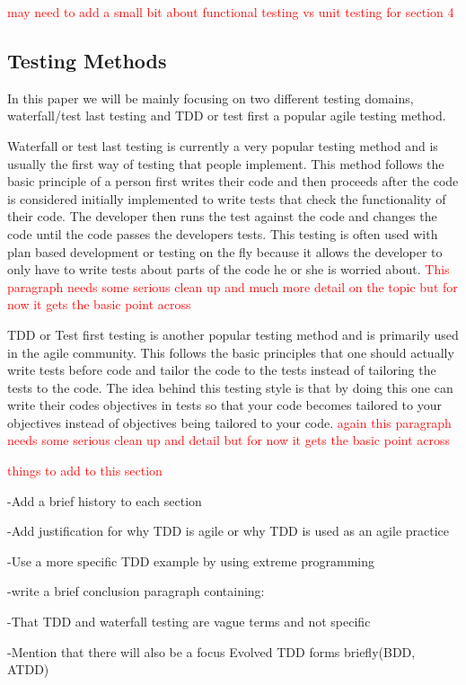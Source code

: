 \documentclass{sig-alternate}
\newcommand{\mycomment}[1]{\textcolor{red}{#1}}
\begin{document}
\mycomment{may need to add a small bit about functional testing vs unit testing for section 4}

\subsection{Testing Methods}
In this paper we will be mainly focusing on two different testing domains, waterfall/test last testing and TDD or test first a popular agile testing method.

Waterfall or test last testing is currently a very popular testing method and is usually the first way of testing that people implement.  This method follows the basic principle of a person first writes their code and then proceeds after the code is considered initially implemented to write tests that check the functionality of their code.  The developer then runs the test against the code and changes the code until the code passes the developers tests.  This testing is often used with plan based development or testing on the fly because it allows the developer to only have to write tests about parts of the code he or she is worried about. \mycomment{This paragraph needs some serious clean up and much more detail on the topic but for now it gets the basic point across}

TDD or Test first testing is another popular testing method and is primarily used in the agile community.  This follows the basic principles that one should actually write tests before code and tailor the code to the tests instead of tailoring the tests to the code.  The idea behind this testing style is that by doing this one can write their codes objectives in tests so that your code becomes tailored to your objectives instead of objectives being tailored to your code.  \mycomment{again this paragraph needs some serious clean up and detail but for now it gets the basic point across}

\mycomment{things to add to this section}

-Add a brief history to each section

-Add justification for why TDD is agile or why TDD is used as an agile practice

-Use a more specific TDD example by using extreme programming

-write a brief conclusion paragraph containing:

-That TDD and waterfall testing are vague terms and not specific

-Mention that there will also be a focus Evolved TDD forms briefly(BDD, ATDD)
\end{document}
